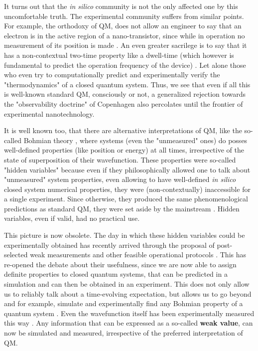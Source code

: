 \documentclass[11pt, a4paper]{article} %
\begin{document}
It turns out that the {\em in silico} community is not the only affected one by this uncomfortable truth. The experimental community suffers from similar points. For example, the orthodoxy of QM, does not allow an engineer to say that an electron is in the active region of a nano-transistor, since while in operation no measurement of its position is made \cite{where}. An even greater sacrilege is to say that it has a non-contextual two-time property like a dwell-time (which however is fundamental to predict the operation frequency of the device) \cite{tunnel1, tunnel2,modern}. Let alone those who even try to computationally predict and experimentally verify the "thermodynamics" of a closed quantum system. Thus, we see that even if all this is well-known standard QM, consciously or not, a generalized rejection towards the "observability doctrine" of Copenhagen \cite{Dirac} also percolates until the frontier of experimental nanotechnology.

It is well known too, that there are alternative interpretations of QM, like the so-called Bohmian theory \cite{Holland, Durr, JordiXavier}, where systems (even the "unmeasured" ones) do posses well-defined properties (like position or energy) at all times, irrespective of the state of superposition of their wavefunction. These properties were so-called "hidden variables" because even if they philosophically allowed one to talk about "unmeasured" system properties, even allowing to have well-defined {\em in silico} closed system numerical properties, they were (non-contextually) inaccessible for a single experiment. Since otherwise, they produced the same phenomenological predictions as standard QM, they were set aside by the mainstream \cite{JordiXavier}. Hidden variables, even if valid, had no practical use. %

This picture is now obsolete. The day in which these hidden variables could be experimentally obtained has recently arrived through the proposal of post-selected weak measurements \cite{Weak, DevInPosition2} and other feasible operational protocols \cite{strongweak}. This has re-opened the debate about their usefulness, since we are now able to assign definite properties to closed quantum systems, that can be predicted in a simulation and can then be obtained in an experiment. This does not only allow us to reliably talk about a time-evolving expectation, but allows us to go beyond and for example, simulate and experimentally find any Bohmian property of a quantum system \cite{WisemanVel, DevInPosition2}. Even the wavefunction itself has been experimentally measured this way \cite{directWF}. Any information that can be expressed as a so-called {\bf weak value}, can now be simulated and measured, irrespective of the preferred interpretation of QM.
\end{document}
